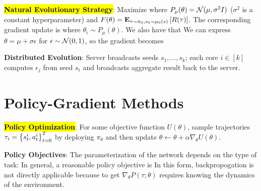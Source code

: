 \documentclass{article}
\begin{document}
  \hl{\textbf{Natural Evolutionary Strategy}}: Maximize
  where $P_\mu(\theta)=\mathcal{N}(\mu,\sigma^2I)$ ($\sigma^2$ is a constant hyperparameter) and $F(\theta)=\mathbf{E}_{\tau\sim\pi_0,s_0\sim\mu_0(s)}\left[ R(\tau)\right]$. The corresponding gradient update is
  where $\theta_i\sim P_\mu(\theta)$. We also have that
  We can express $\theta=\mu+\sigma\epsilon$ for $\epsilon\sim\mathcal{N}(0,1)$, so the gradient becomes

  \textbf{Distributed Evolution}: Server broadcasts seeds $s_1,\dots,s_k$; each core $i\in[k]$ computes $\epsilon_j$ from seed $s_i$ and broadcasts aggregate result back to the server.

\section{Policy-Gradient Methods}

  \hl{\textbf{Policy Optimization}}: For some objective function $U(\theta)$, sample trajectories $\tau_i=\left\{ s_t^i,a_t^i \right\}_{t=0}^T$ by deploying $\pi_\theta$ and then update $\theta\leftarrow \theta+\alpha\nabla_\theta U(\theta)$. 

  \textbf{Policy Objectives}: The parameterization of the network depends on the type of task:
  In general, a reasonable policy objective is
  In this form, backpropogation is not directly applicable because to get $\nabla_\theta P(\tau;\theta)$ requires knowing the dynamics of the environment.
\end{document}
